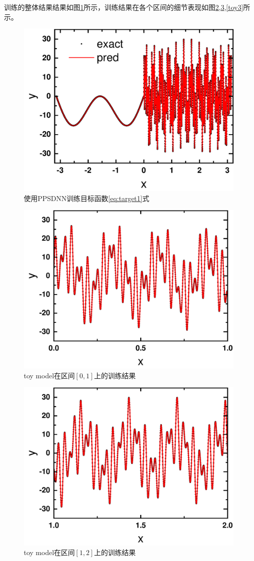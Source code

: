   训练的整体结果结果如图\ref{sin}所示，训练结果在各个区间的细节表现如图\ref{toy1},\ref{toy2},\ref{toy3}所示。
\begin{figure}[htbp!]
  \centering
  \includegraphics[width=0.77\linewidth]{figures/toymodel/train.pdf}
  \caption{使用PPSDNN训练目标函数\ref{eq:target1}式}
  \label{sin}
\end{figure}
\begin{figure}[htbp]
  \centering
  \includegraphics[width=0.76\linewidth]{figures/toymodel/train1.pdf}
  \caption{toy model在区间$[0,1]$上的训练结果}
  \label{toy1}
\end{figure}
\begin{figure}[htbp]
  \centering
  \includegraphics[width=0.76\linewidth]{figures/toymodel/train2.pdf}
  \caption{toy model在区间$[1,2]$上的训练结果}
  \label{toy2}
\end{figure}

